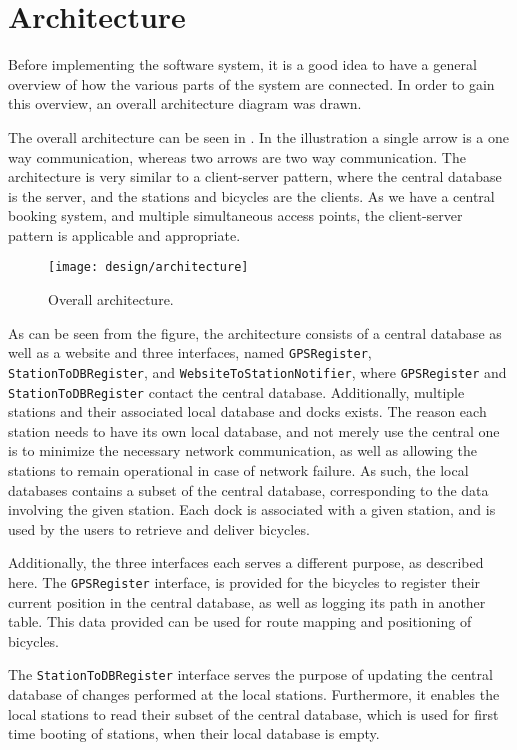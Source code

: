 \section{Architecture}\label{sec:architecture}
Before implementing the software system, it is a good idea to have a general overview of how the various parts of the system are connected.
In order to gain this overview, an overall architecture diagram was drawn.

The overall architecture can be seen in .
In the illustration a single arrow is a one way communication, whereas two arrows are two way communication.
The architecture is very similar to a client-server pattern, where the central database is the server, and the stations and bicycles are the clients.
As we have a central booking system, and multiple simultaneous access points, the client-server pattern is applicable and appropriate.

\begin{figure}[h]
	\centering
	\texttt{[image: design/architecture]}
	\caption{Overall architecture.}\label{fig:overallarch}
\end{figure}

As can be seen from the figure, the architecture consists of a central database as well as a website and three interfaces, named \texttt{GPSRegister}, \texttt{StationToDBRegister}, and \texttt{WebsiteTo\-StationNotifier}, where \texttt{GPS\-Register} and \texttt{StationToDBRegister} contact the central database.
Additionally, multiple stations and their associated local database and docks exists.
The reason each station needs to have its own local database, and not merely use the central one is to minimize the necessary network communication, as well as allowing the stations to remain operational in case of network failure.
As such, the local databases contains a subset of the central database, corresponding to the data involving the given station.
Each dock is associated with a given station, and is used by the users to retrieve and deliver bicycles.

Additionally, the three interfaces each serves a different purpose, as described here.
The \texttt{GPS\-Register} interface, is provided for the bicycles to register their current position in the central database, as well as logging its path in another table.
This data provided can be used for route mapping and positioning of bicycles.

The \texttt{StationToDBRegister} interface serves the purpose of updating the central database of changes performed at the local stations. Furthermore, it enables the local stations to read their subset of the central database, which is used for first time booting of stations, when their local database is empty.

